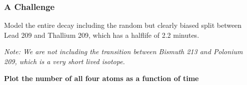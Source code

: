 \subsubsection{A Challenge}\label{a-challenge}

Model the entire decay including the random but clearly biased split
between Lead 209 and Thallium 209, which has a halflife of 2.2 minutes.

\emph{Note: We are not including the transition between Bismuth 213 and
Polonium 209, which is a very short lived isotope.}

\textbf{Plot the number of all four atoms as a function of time}

\begin{Shaded}
\begin{Highlighting}[]
\end{Highlighting}
\end{Shaded}
